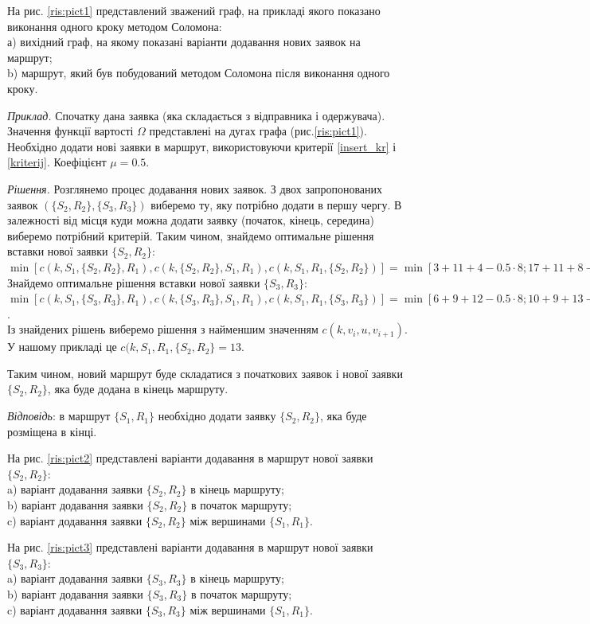 \documentclass[]{TAACpaper}
\begin{document}
На рис. \ref{ris:pict1} представлений зважений граф, на прикладі якого показано виконання одного кроку методом Соломона:\\
а) вихідний граф, на якому показані варіанти додавання нових заявок на маршрут;\\
b) маршрут, який був побудований методом Соломона після виконання одного кроку.

\textit{Приклад.} Спочатку дана заявка (яка складається з відправника і одержувача). Значення функції вартості $\Omega$ представлені на дугах графа (рис.\ref{ris:pict1}). Необхідно додати нові заявки в маршрут, використовуючи критерії \ref{insert_kr} і \ref{kriterij}. Коефіцієнт $\mu=0.5$.

\textit{Рішення.} Розглянемо процес додавання нових заявок. З двох запропонованих заявок $(\{S_2,R_2\},\{S_3,R_3\})$ виберемо ту, яку потрібно додати в першу чергу. В залежності від місця куди можна додати заявку (початок, кінець, середина) виберемо потрібний критерій. Таким чином, знайдемо оптимальне рішення вставки нової заявки $\{S_2,R_2\}$:\\
$\min[c(k,S_1, \{S_2, R_2\}, R_1), c(k,\{S_2, R_2\}, S_1, R_1), c(k, S_1, R_1, \{S_2, R_2\})]=\min[3+11+4-0.5 \cdot 8; 17+11+8-0.5 \cdot 20; 2+11]=\min[14;26;13]$\\
Знайдемо оптимальне рішення вставки нової заявки $\{S_3,R_3\}$:\\ 
$\min[c(k,S_1, \{S_3, R_3\}, R_1), c(k,\{S_3, R_3\}, S_1, R_1), c(k, S_1, R_1, \{S_3, R_3\})]=\min[6+9+12-0.5 \cdot 8; 10+9+13-0.5 \cdot 20; 5+9]=\min[23;22;14]$.\\
Із знайдених рішень виберемо рішення з найменшим значенням $c(k,v_i,u,v_{i+1})$. У нашому прикладі це $c(k, S_1, R_1, \{S_2, R_2\}=13$.

Таким чином, новий маршрут буде складатися з початкових заявок і нової заявки $\{S_2,R_2\}$, яка буде додана в кінець маршруту.

\textit{Відповідь}: в маршрут $\{S_1,R_1\}$ необхідно додати заявку $\{S_2,R_2\}$, яка буде розміщена в кінці. 

На рис. \ref{ris:pict2} представлені варіанти додавання в маршрут нової заявки $\{S_2,R_2\}$:\\
a) варіант додавання заявки $\{S_2,R_2\}$ в кінець маршруту;\\
b) варіант додавання заявки $\{S_2,R_2\}$ в початок маршруту;\\
c) варіант додавання заявки $\{S_2,R_2\}$ між вершинами $\{S_1,R_1\}$.

На рис. \ref{ris:pict3} представлені варіанти додавання в маршрут нової заявки $\{S_3,R_3\}$:\\
a) варіант додавання заявки $\{S_3,R_3\}$ в кінець маршруту;\\
b) варіант додавання заявки $\{S_3,R_3\}$ в початок маршруту;\\
c) варіант додавання заявки $\{S_3,R_3\}$ між вершинами $\{S_1,R_1\}$.
\end{document}
